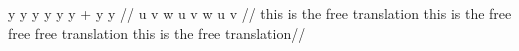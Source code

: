 
\ey
\begingl  {}
\gla y y y y y y + y y //
\glb u v w u v w u v //
\glft this is the free translation this is the
free free free translation this is the free translation//
\endgl
\ye



